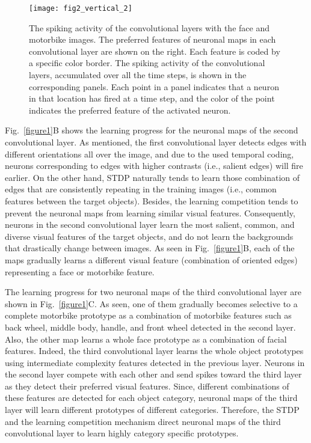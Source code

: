 \documentclass[preprint,5p,12pt,twocolumn]{article}
\begin{document}
\begin{figure*}[!htb]
\centering
\texttt{[image: fig2\_vertical\_2]}
\caption{ The spiking activity of the convolutional layers with the face and motorbike images. The preferred features of neuronal maps in each convolutional layer are shown on the right. Each feature is coded by a specific color border. The spiking activity of the convolutional layers, accumulated over all the time steps, is shown in the corresponding panels. Each point in a panel indicates that a neuron in that location has fired at a time step, and the color of the point indicates the preferred feature of the activated neuron.}
\label{figure2}
\end{figure*}


Fig.~\ref{figure1}B shows the learning progress for the neuronal  maps of the second convolutional layer. As mentioned, the first convolutional layer detects edges with different orientations all over the image, and due to the used temporal coding, neurons corresponding to edges with higher contrasts (i.e., salient edges) will fire earlier. On the other hand, STDP naturally tends to learn those combination of edges that are consistently repeating in the training images (i.e., common features between the target objects). Besides, the learning competition tends to prevent the neuronal maps from learning similar visual features. Consequently, neurons in the second convolutional layer learn the most salient, common, and diverse visual features of the target objects, and do not learn the backgrounds that drastically change between images. As seen in Fig.~\ref{figure1}B, each of the maps gradually learns a different visual feature (combination of oriented edges) representing a face or motorbike feature.



The learning progress for two neuronal maps of the third convolutional layer are shown in Fig.~\ref{figure1}C.  As seen, one of them gradually becomes selective to a complete motorbike prototype as a combination of motorbike features such as back wheel, middle body, handle, and front wheel detected in the second layer. Also, the other map learns a whole face prototype as a combination of facial features. Indeed, the third convolutional layer learns the whole object prototypes using intermediate complexity features detected in the previous layer. Neurons in the second layer compete with each other and send spikes toward the third layer as they detect their preferred visual features. Since, different combinations of these features are detected for each object category, neuronal maps of the third layer will learn different prototypes of different categories. Therefore, the STDP and the learning competition mechanism direct neuronal maps of the third convolutional layer to learn highly category specific prototypes.
\end{document}
